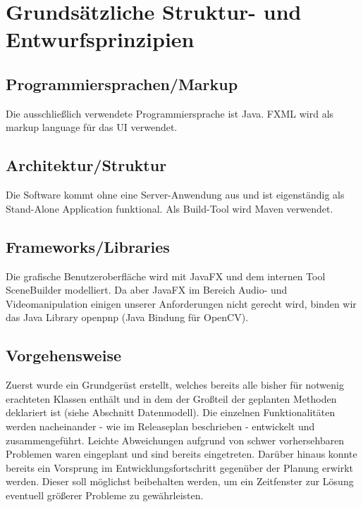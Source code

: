 \chapter{Grundsätzliche Struktur- und Entwurfsprinzipien}

\section{Programmiersprachen/Markup}
Die ausschließlich verwendete Programmiersprache ist Java. FXML wird als markup language für das UI verwendet.

\section{Architektur/Struktur}
Die Software kommt ohne eine Server-Anwendung aus und ist eigenständig als Stand-Alone Application funktional.
Als Build-Tool wird Maven verwendet.

\section{Frameworks/Libraries}
Die grafische Benutzeroberfläche wird mit JavaFX und dem internen Tool SceneBuilder modelliert.
Da aber JavaFX im Bereich Audio- und Videomanipulation einigen unserer Anforderungen nicht gerecht wird, binden wir das Java Library openpnp (Java Bindung für OpenCV).

\section{Vorgehensweise}
Zuerst wurde ein Grundgerüst erstellt, welches bereits alle bisher für notwenig erachteten Klassen enthält und in dem der Großteil der geplanten Methoden deklariert ist (siehe Abschnitt \glqq Datenmodell\grqq).
Die einzelnen Funktionalitäten werden nacheinander - wie im Releaseplan beschrieben - entwickelt und zusammengeführt.
Leichte Abweichungen aufgrund von schwer vorhersehbaren Problemen waren eingeplant und sind bereits eingetreten. Darüber hinaus konnte bereits ein Vorsprung im Entwicklungsfortschritt gegenüber der Planung erwirkt werden. Dieser soll möglichst beibehalten werden, um ein Zeitfenster zur Lösung eventuell größerer Probleme zu gewährleisten.